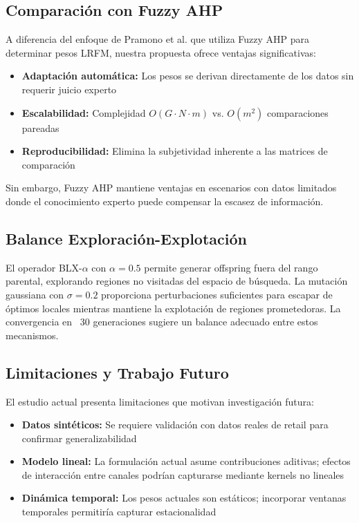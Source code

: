\documentclass[conference]{IEEEtran}
\begin{document}
\subsection{Comparación con Fuzzy AHP}
A diferencia del enfoque de Pramono et al. \cite{pramono2019} que utiliza Fuzzy AHP para determinar pesos LRFM, nuestra propuesta ofrece ventajas significativas:
\begin{itemize}
    \item \textbf{Adaptación automática:} Los pesos se derivan directamente de los datos sin requerir juicio experto
    \item \textbf{Escalabilidad:} Complejidad $O(G \cdot N \cdot m)$ vs. $O(m^2)$ comparaciones pareadas
    \item \textbf{Reproducibilidad:} Elimina la subjetividad inherente a las matrices de comparación
\end{itemize}

Sin embargo, Fuzzy AHP mantiene ventajas en escenarios con datos limitados donde el conocimiento experto puede compensar la escasez de información.

\subsection{Balance Exploración-Explotación}
El operador BLX-$\alpha$ con $\alpha=0.5$ permite generar offspring fuera del rango parental, explorando regiones no visitadas del espacio de búsqueda. La mutación gaussiana con $\sigma=0.2$ proporciona perturbaciones suficientes para escapar de óptimos locales mientras mantiene la explotación de regiones prometedoras. La convergencia en ~30 generaciones sugiere un balance adecuado entre estos mecanismos.

\subsection{Limitaciones y Trabajo Futuro}
El estudio actual presenta limitaciones que motivan investigación futura:
\begin{itemize}
    \item \textbf{Datos sintéticos:} Se requiere validación con datos reales de retail para confirmar generalizabilidad
    \item \textbf{Modelo lineal:} La formulación actual asume contribuciones aditivas; efectos de interacción entre canales podrían capturarse mediante kernels no lineales
    \item \textbf{Dinámica temporal:} Los pesos actuales son estáticos; incorporar ventanas temporales permitiría capturar estacionalidad
\end{itemize}
\end{document}
